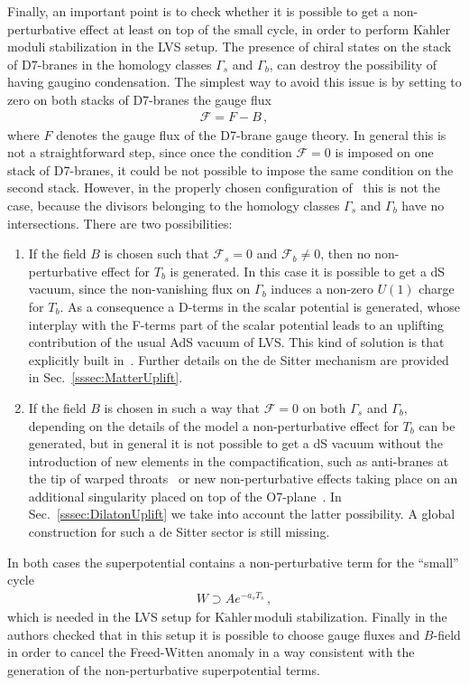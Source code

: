 \documentclass[12pt,a4paper]{book}
\newcommand{\Kahler}{\ensuremath{\text{K}\ddot{\text{a}}\text{hler}\,}}
\newcommand{\ben}{\begin{enumerate}}
\newcommand{\een}{\end{enumerate}}
\begin{document}
Finally, an important point is to check whether it is possible to get a non-perturbative effect at least on top of the small cycle, in order to perform \Kahler moduli stabilization in the LVS setup. The presence of chiral states on the stack of D7-branes in the homology classes $\Gamma_s$ and $\Gamma_b$, can destroy the possibility of having gaugino condensation. The simplest way to avoid this issue is by setting to zero on both stacks of D7-branes the gauge flux
\begin{align}
\label{eq:GaugeFlux}
\mathcal{F} = F - B\,,
\end{align}
where $F$ denotes the gauge flux of the D7-brane gauge theory. In general this is not a straightforward step, since once the condition $\mathcal{F} = 0$ is imposed on one stack of D7-branes, it could be not possible to impose the same condition on the second stack. However, in the properly chosen configuration of~\cite{Cicoli:2012vw} this is not the case, because the divisors belonging to the homology classes $\Gamma_s$ and $\Gamma_b$ have no intersections. There are two possibilities:
\ben
\item If the field $B$ is chosen such that $\mathcal{F}_s = 0$ and $\mathcal{F}_b \neq 0$, then no non-perturbative effect for $T_b$ is generated. In this case it is possible to get a dS vacuum, since the non-vanishing flux on $\Gamma_b$ induces a non-zero $U(1)$ charge for $T_b$. As a consequence a D-terms in the scalar potential is generated, whose interplay with the F-terms part of the scalar potential leads to an uplifting contribution of the usual AdS vacuum of LVS. This kind of solution is that explicitly built in~\cite{Cicoli:2012vw}. Further details on the de Sitter mechanism are provided in Sec.~\ref{sssec:MatterUplift}.
\item If the field $B$ is chosen in such a way that $\mathcal{F} = 0$ on both $\Gamma_s$ and $\Gamma_b$, depending on the details of the model a non-perturbative effect for $T_b$ can be generated, but in general it is not possible to get a dS vacuum without the introduction of new elements in the compactification, such as anti-branes at the tip of warped throats~\cite{Kachru:2003aw} or new non-perturbative effects taking place on an additional singularity placed on top of the O7-plane~\cite{Cicoli:2012fh}. In Sec.~\ref{sssec:DilatonUplift} we take into account the latter possibility. A global construction for such a de Sitter sector is still missing.
\een
In both cases the superpotential contains a non-perturbative term for the ``small'' cycle
\begin{align}
\label{eq:SuperpotentialExplicit}
W \supset A e^{- a_s T_s}\,,
\end{align}
which is needed in the LVS setup for \Kahler moduli stabilization. Finally in \cite{Cicoli:2012vw} the authors checked that in this setup it is possible to choose gauge fluxes and $B$-field in order to cancel the Freed-Witten anomaly in a way consistent with the generation of the non-perturbative superpotential terms.\\
\end{document}
